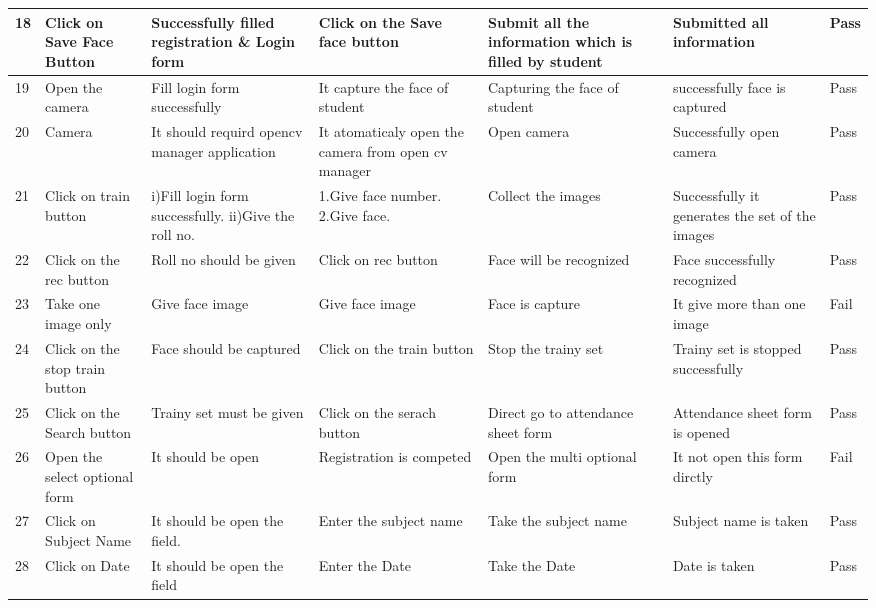 \begin{center}
\begin{landscape}
\begin{longtable}{|p{1cm}|p{3.4cm}|p{4cm}|p{4cm}|p{3cm}|p{3cm}|p{1cm}|}
    18    & Click on Save Face Button & Successfully filled registration \& Login form & Click on the Save face button & Submit all the information which is filled by student  & Submitted all information & Pass \\ \hline

    19    & Open the camera & Fill login form successfully & It capture the face of student & Capturing the face of student & successfully face is captured & Pass \\ \hline       

    20    & Camera & It should requird opencv manager application & It atomaticaly open the camera from open cv manager & Open camera & Successfully open camera & Pass \\ \hline

    21    & Click on train button & i)Fill login form successfully. ii)Give the roll no.  & 1.Give face number. 2.Give face.  & Collect the images & Successfully it generates the set of the images & Pass \\ \hline

    22    & Click on the rec button & Roll no should be given & Click on rec button & Face will be recognized & Face successfully recognized & Pass \\ \hline

    23    & Take one image only & Give face image & Give face image & Face is capture & It give more than one image & Fail \\ \hline

    24    & Click on the stop train button  & Face should be captured & Click on the train button & Stop the trainy set & Trainy set is stopped successfully & Pass \\ \hline

    25    & Click on the Search button & Trainy set must be given & Click on the serach button & Direct go to attendance sheet form & Attendance sheet form is opened & Pass \\ \hline

     26    & Open the select optional form & It should be open & Registration is competed & Open the multi optional form & It not open this form dirctly & Fail \\ \hline

    27   & Click on Subject Name & It  should be open the field.  & Enter the subject name & Take the subject name & Subject name is taken & Pass \\ \hline

    28    & Click on Date & It  should be open the field & Enter the Date & Take the Date & Date is taken & Pass \\ \hline


\end{longtable}
\end{landscape}
\end{center}
